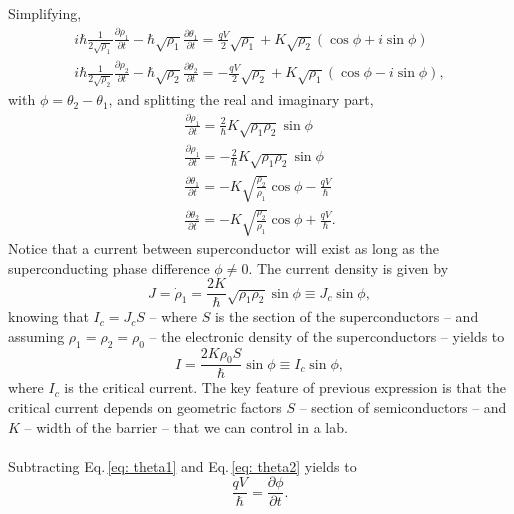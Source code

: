 Simplifying, 
\begin{align}
i\hbar \frac{1}{2\sqrt{\rho_{1}}}\frac{\partial \rho_{1}}{\partial t} - \hbar\sqrt{\rho_{1}}\frac{\partial\theta_{1}}{\partial t} = \frac{qV}{2}\sqrt{\rho_{1}} + K\sqrt{\rho_{2}}\left(\cos{\phi} + i\sin{\phi}\right) \\
i\hbar \frac{1}{2\sqrt{\rho_{2}}}\frac{\partial \rho_{2}}{\partial t} - \hbar\sqrt{\rho_{2}}\frac{\partial\theta_{2}}{\partial t} = -\frac{qV}{2}\sqrt{\rho_{2}} + K\sqrt{\rho_{1}}\left(\cos{\phi} - i\sin{\phi}\right),
\end{align}
with $\phi = \theta_{2} - \theta_{1}$, and splitting the real and imaginary part,
\begin{align}
\frac{\partial \rho_{1}}{\partial t} = \frac{2}{\hbar}K\sqrt{\rho_{1}\rho_{2}}\sin{\phi} \\
\frac{\partial \rho_{1}}{\partial t} = -\frac{2}{\hbar}K\sqrt{\rho_{1}\rho_{2}}\sin{\phi} \\
\label{eq: theta1}
\frac{\partial \theta_{1}}{\partial t} = - K\sqrt{\frac{\rho_{2}}{\rho_{1}}}\cos{\phi}-\frac{qV}{\hbar} \\
\label{eq: theta2}
\frac{\partial \theta_{2}}{\partial t} = - K\sqrt{\frac{\rho_{2}}{\rho_{1}}}\cos{\phi}+\frac{qV}{\hbar}.
\end{align}
Notice that a current between superconductor will exist as long as the superconducting phase difference $\phi \neq 0$.
The current density is given by
\begin{equation}
J = \dot{\rho}_{1} = \frac{2K}{\hbar}\sqrt{\rho_{1}\rho_{2}}\sin{\phi} \equiv J_{c}\sin{\phi},
\end{equation}
knowing that $I_{c} = J_{c}S$ -- where $S$ is the section of the superconductors -- and assuming $\rho_{1} = \rho_{2} =\rho_{0}$ -- the electronic density of the superconductors -- yields to
\begin{equation}
\tag{First Joshepshon equation}
I =\frac{2K\rho_{0}S}{\hbar}\sin{\phi} \equiv I_{c}\sin{\phi},
\end{equation}
where $I_{c}$ is the critical current.
The key feature of previous expression is that the critical current depends on geometric factors $S$ -- section of semiconductors -- and $K$ -- width of the barrier -- that we can control in a lab.\\\\
Subtracting Eq.\,\eqref{eq: theta1} and Eq.\,\eqref{eq: theta2} yields to
\begin{equation}
\frac{qV}{\hbar} = \frac{\partial\phi}{\partial t}.
\end{equation}
